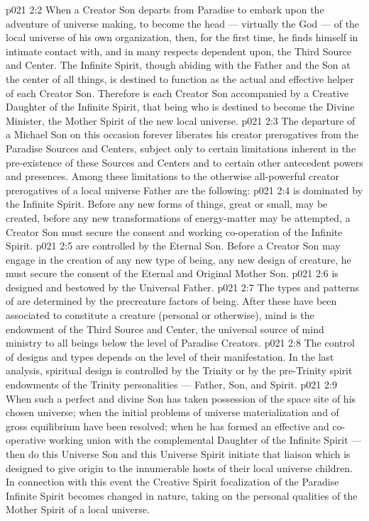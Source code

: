 \vs p021 2:2 \pc When a Creator Son departs from Paradise to embark upon the adventure of universe making, to become the head --- virtually the God --- of the local universe of his own organization, then, for the first time, he finds himself in intimate contact with, and in many respects dependent upon, the Third Source and Center. The Infinite Spirit, though abiding with the Father and the Son at the center of all things, is destined to function as the actual and effective helper of each Creator Son. Therefore is each Creator Son accompanied by a Creative Daughter of the Infinite Spirit, that being who is destined to become the Divine Minister, the Mother Spirit of the new local universe.
\vs p021 2:3 The departure of a Michael Son on this occasion forever liberates his creator prerogatives from the Paradise Sources and Centers, subject only to certain limitations inherent in the pre\hyp{}existence of these Sources and Centers and to certain other antecedent powers and presences. Among these limitations to the otherwise all\hyp{}powerful creator prerogatives of a local universe Father are the following:
\vs p021 2:4 \bibnobreakspace {} is dominated by the Infinite Spirit. Before any new forms of things, great or small, may be created, before any new transformations of energy\hyp{}matter may be attempted, a Creator Son must secure the consent and working co\hyp{}operation of the Infinite Spirit.
\vs p021 2:5 \bibnobreakspace {} are controlled by the Eternal Son. Before a Creator Son may engage in the creation of any new type of being, any new design of creature, he must secure the consent of the Eternal and Original Mother Son.
\vs p021 2:6 \bibnobreakspace {} is designed and bestowed by the Universal Father.
\vs p021 2:7 \pc The types and patterns of  are determined by the precreature factors of being. After these have been associated to constitute a creature (personal or otherwise), mind is the endowment of the Third Source and Center, the universal source of mind ministry to all beings below the level of Paradise Creators.
\vs p021 2:8 \pc The control of  designs and types depends on the level of their manifestation. In the last analysis, spiritual design is controlled by the Trinity or by the pre\hyp{}Trinity spirit endowments of the Trinity personalities --- Father, Son, and Spirit.
\vs p021 2:9 \pc When such a perfect and divine Son has taken possession of the space site of his chosen universe; when the initial problems of universe materialization and of gross equilibrium have been resolved; when he has formed an effective and co\hyp{}operative working union with the complemental Daughter of the Infinite Spirit --- then do this Universe Son and this Universe Spirit initiate that liaison which is designed to give origin to the innumerable hosts of their local universe children. In connection with this event the Creative Spirit focalization of the Paradise Infinite Spirit becomes changed in nature, taking on the personal qualities of the Mother Spirit of a local universe.
